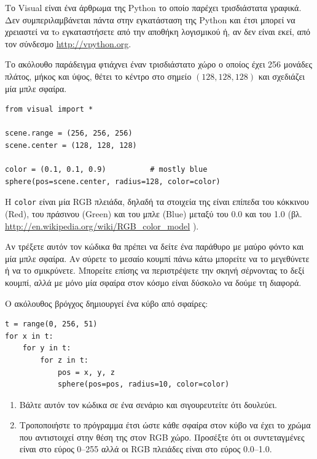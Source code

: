 \documentclass[10pt]{book}
\begin{document}
\begin{exercise}

Το Visual είναι ένα άρθρωμα της Python το οποίο παρέχει τρισδιάστατα γραφικά. Δεν συμπεριλαμβάνεται πάντα
στην εγκατάσταση της Python και έτσι μπορεί να χρειαστεί να τo εγκαταστήσετε από την αποθήκη λογισμικού ή,
αν δεν είναι εκεί, από τον σύνδεσμο \url{http://vpython.org}.

Το ακόλουθο παράδειγμα φτιάχνει έναν τρισδιάστατο χώρο ο οποίος έχει 256
μονάδες πλάτος, μήκος και ύψος, θέτει το κέντρο στο σημείο $(128,128,128)$ και   
σχεδιάζει μία μπλε σφαίρα. 

\begin{verbatim}
from visual import *

scene.range = (256, 256, 256)
scene.center = (128, 128, 128)

color = (0.1, 0.1, 0.9)          # mostly blue
sphere(pos=scene.center, radius=128, color=color)
\end{verbatim}

Η {\tt color} είναι μία  RGB  πλειάδα, δηλαδή τα στοιχεία της είναι
επίπεδα του κόκκινου (Red), του πράσινου (Green) και του μπλε (Blue)
μεταξύ του 0.0 και του 1.0 (βλ. \url{http://en.wikipedia.org/wiki/RGB_color_model} ).

Αν τρέξετε αυτόν τον κώδικα θα πρέπει να δείτε ένα παράθυρο με μαύρο φόντο και μία
μπλε σφαίρα. Αν σύρετε το μεσαίο κουμπί πάνω κάτω μπορείτε να το μεγεθύνετε ή να το
σμικρύνετε. Μπορείτε επίσης να περιστρέψετε την σκηνή σέρνοντας το δεξί κουμπί, αλλά
με μόνο μία σφαίρα στον κόσμο είναι δύσκολο να δούμε τη διαφορά.

Ο ακόλουθος βρόγχος δημιουργεί ένα κύβο από σφαίρες:

\begin{verbatim}
t = range(0, 256, 51)
for x in t:
    for y in t:
        for z in t:
            pos = x, y, z
            sphere(pos=pos, radius=10, color=color)
\end{verbatim}

 
\begin{enumerate}

\item Βάλτε αυτόν τον κώδικα σε ένα σενάριο και σιγουρευτείτε ότι δουλεύει.

\item Τροποποιήστε το πρόγραμμα έτσι ώστε κάθε σφαίρα στον κύβο να έχει το χρώμα 
που αντιστοιχεί στην θέση της στον RGB χώρο. Προσέξτε ότι οι συντεταγμένες 
είναι στο εύρος 0--255 αλλά οι RGB πλειάδες είναι στο εύρος 0.0--1.0.


\end{enumerate}
\end{exercise}
\end{document}
